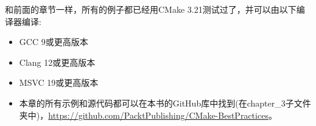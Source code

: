 
和前面的章节一样，所有的例子都已经用CMake 3.21测试过了，并可以由以下编译器编译:

\begin{itemize}
\item 
GCC 9或更高版本

\item 
Clang 12或更高版本

\item 
MSVC 19或更高版本

\item 
本章的所有示例和源代码都可以在本书的GitHub库中找到(在chapter\_3子文件夹中)，\url{https://github.com/PacktPublishing/CMake-BestPractices}。
\end{itemize}
